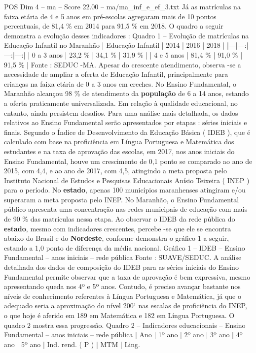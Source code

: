 \begin{textsample}{POS Dim 4 – ma – Score 22.00 – ma/ma\_inf\_e\_ef\_3.txt}
Já as matrículas na faixa etária de 4 e 5 anos em pré-escolas agregaram mais de 10 pontos percentuais, de 81,4 \% em 2014 para 91,5 \% em 2018.
O quadro a seguir demonstra a evolução desses indicadores : Quadro 1 – Evolução de matrículas na Educação Infantil no Maranhão | Educação Infantil | 2014 | 2016 | 2018 | |---|---:|---:|---:| | 0 a 3 anos | 23,2 \% | 34,1 \% | 31,9 \% | | 4 e 5 anos | 81,4 \% | 91,0 \% | 91,5 \% | Fonte : SEDUC -MA.
Apesar do crescente atendimento, observa -se a necessidade de ampliar a oferta de Educação Infantil, principalmente para crianças na faixa etária de 0 a 3 anos em creches.
No Ensino Fundamental, o Maranhão alcançou 98 \% de atendimento da \textbf{população} de 6 a 14 anos, estando a oferta praticamente universalizada.
Em relação à qualidade educacional, no entanto, ainda persistem desafios.
Para uma análise mais detalhada, os dados relativos ao Ensino Fundamental serão apresentados por etapas : séries iniciais e finais.
Segundo o Índice de Desenvolvimento da Educação Básica ( IDEB ), que é calculado com base na proficiência em Língua Portuguesa e Matemática dos estudantes e na taxa de aprovação das escolas, em 2017, nos anos iniciais do Ensino Fundamental, houve um crescimento de 0,1 ponto se comparado ao ano de 2015, com 4,4, e ao ano de 2017, com 4,5, atingindo a meta proposta pelo Instituto Nacional de Estudos e Pesquisas Educacionais Anísio Teixeira ( INEP ) para o período.
No \textbf{estado}, apenas 100 municípios maranhenses atingiram e/ou superaram a meta proposta pelo INEP.
No Maranhão, o Ensino Fundamental público apresenta uma concentração nas redes municipais de educação com mais de 90 \% das matrículas nessa etapa.
Ao observar o IDEB da rede pública do \textbf{estado}, mesmo com indicadores crescentes, percebe -se que ele se encontra abaixo do Brasil e do \textbf{Nordeste}, conforme demonstra o gráfico 1 a seguir, estando a 1,0 ponto de diferença da média nacional.
Gráfico 1 – IDEB – Ensino Fundamental – anos iniciais – rede pública Fonte : SUAVE/SEDUC.
A análise detalhada dos dados de composição do IDEB para as séries iniciais do Ensino Fundamental permite observar que a taxa de aprovação é bem expressiva, mesmo apresentando queda nos 4º e 5º anos.
Contudo, é preciso avançar bastante nos níveis de conhecimento referentes à Língua Portuguesa e Matemática, já que o adequado seria a aproximação do nível 200¹ nas escalas de proficiência do INEP, o que hoje é aferido em 189 em Matemática e 182 em Língua Portuguesa.
O quadro 2 mostra essa progressão.
Quadro 2 – Indicadores educacionais – Ensino Fundamental – anos iniciais – rede pública | Ano | 1º ano | 2º ano | 3º ano | 4º ano | 5º ano | Ind. rend. ( P ) | MTM | Ling.

\end{textsample}
